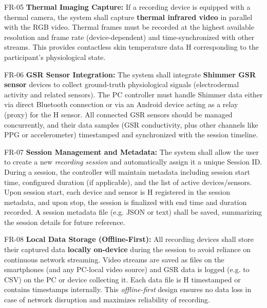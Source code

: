\documentclass[11pt,a4paper]{report}
\begin{document}
  FR-05 \textbf{Thermal Imaging Capture:} If a recording device is equipped with a
  thermal camera, the system shall capture \textbf{thermal infrared video} in
  parallel with the RGB video.  Thermal frames must be recorded at the highest
  available resolution and frame rate (device-dependent) and time-synchronized with
  other streams.  This provides contactless skin temperature data H
                          corresponding to the participant's physiological state.

  FR-06 \textbf{GSR Sensor Integration:} The system shall integrate \textbf{Shimmer
  GSR sensor} devices to collect ground-truth physiological signals (electrodermal
  activity and related sensors).  The PC controller must handle Shimmer data either
  via direct Bluetooth connection or via an Android device acting as a relay (proxy)
  for the H
                          sensor\cite{AppleHealthWatch2019}.  All connected GSR
                          sensors should be managed concurrently, and their data
                          samples (GSR conductivity, plus other channels like PPG or
                          accelerometer) timestamped and synchronized with the
                          session timeline.

  FR-07 \textbf{Session Management and Metadata:} The system shall allow the user to
  create a new \textit{recording session} and automatically assign it a unique
  Session ID.  During a session, the controller will maintain metadata including
  session start time, configured duration (if applicable), and the list of active
  devices/sensors.  Upon session start, each device and sensor is H
                          registered in the session metadata, and upon stop, the
                          session is finalized with end time and duration
                          recorded\cite{SamsungHealth2020}\cite{Fowles1981}.  A
                          session metadata file (e.g.  JSON or
                          text) shall be saved, summarizing the session details for future reference.

  FR-08 \textbf{Local Data Storage (Offline-First):} All recording devices shall
  store their captured data \textbf{locally on-device} during the session to avoid
  reliance on continuous network streaming.  Video streams are saved as files on the
  smartphones (and any PC-local video source) and GSR data is logged (e.g.  to CSV)
  on the PC or device collecting it.  Each data file is H
                          timestamped or contains timestamps internally.  This
                          \textit{offline-first} design ensures no data loss in case
                          of network disruption and maximizes reliability of
                          recording.
\end{document}
